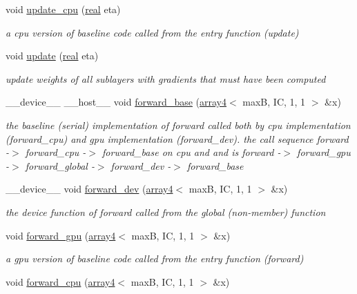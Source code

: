 \begin{DoxyCompactItemize}
void \hyperlink{structLinear_afabe5b3388c37c5b02e9f7ca7f0cd686}{update\+\_\+cpu} (\hyperlink{vgg__util_8h_a1082d08aaa761215ec83e7149f27ad16}{real} eta)
\begin{DoxyCompactList}\small\item\em a cpu version of baseline code called from the entry function (update) \end{DoxyCompactList}\item 
void \hyperlink{structLinear_a828a72af0a1ccac904325ee280dbefa4}{update} (\hyperlink{vgg__util_8h_a1082d08aaa761215ec83e7149f27ad16}{real} eta)
\begin{DoxyCompactList}\small\item\em update weights of all sublayers with gradients that must have been computed \end{DoxyCompactList}\item 
\+\_\+\+\_\+device\+\_\+\+\_\+ \+\_\+\+\_\+host\+\_\+\+\_\+ void \hyperlink{structLinear_adb02d44e0558e4e26b9a550945cd3b7e}{forward\+\_\+base} (\hyperlink{structarray4}{array4}$<$ maxB, IC, 1, 1 $>$ \&x)
\begin{DoxyCompactList}\small\item\em the baseline (serial) implementation of forward called both by cpu implementation (forward\+\_\+cpu) and gpu implementation (forward\+\_\+dev). the call sequence forward -\/$>$ forward\+\_\+cpu -\/$>$ forward\+\_\+base on cpu and and is forward -\/$>$ forward\+\_\+gpu -\/$>$ forward\+\_\+global -\/$>$ forward\+\_\+dev -\/$>$ forward\+\_\+base \end{DoxyCompactList}\item 
\+\_\+\+\_\+device\+\_\+\+\_\+ void \hyperlink{structLinear_a2b86dba92137500810cbf3ed95ee1fcb}{forward\+\_\+dev} (\hyperlink{structarray4}{array4}$<$ maxB, IC, 1, 1 $>$ \&x)
\begin{DoxyCompactList}\small\item\em the device function of forward called from the global (non-\/member) function \end{DoxyCompactList}\item 
void \hyperlink{structLinear_a1d794073640bad48f9722f5d40b98902}{forward\+\_\+gpu} (\hyperlink{structarray4}{array4}$<$ maxB, IC, 1, 1 $>$ \&x)
\begin{DoxyCompactList}\small\item\em a gpu version of baseline code called from the entry function (forward) \end{DoxyCompactList}\item 
void \hyperlink{structLinear_a02f18ced52dc4bd6aa0ea45119c6a7e0}{forward\+\_\+cpu} (\hyperlink{structarray4}{array4}$<$ maxB, IC, 1, 1 $>$ \&x)

\end{DoxyCompactItemize}
